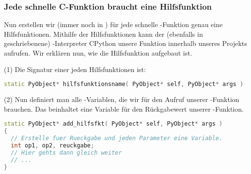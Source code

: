 \subsubsection{Jede schnelle C-Funktion braucht eine Hilfsfunktion}
Nun erstellen wir (immer noch in \C) für jede schnelle \C-Funktion genau eine Hilfsfunktionen.
Mithilfe der Hilfsfunktionen kann der (ebenfalls in \C geschriebenene) \Python-Interpreter CPython unsere Funktion  innerhalb unseres \Python Projekts aufrufen.
Wir erklären nun, wie die Hilfsfunktion aufgebaut ist.

(1) Die Signatur einer jeden Hilfsfunktionen ist:
\begin{lstlisting}[language=C++, style=CPP]
static PyObject* hilfsfunktionsname( PyObject* self, PyObject* args )
\end{lstlisting}

(2) Nun definiert man alle \C-Variablen, die wir für den Aufruf unserer \C-Funktion brauchen.
Das beinhaltet eine Variable für den Rückgabewert unserer \C-Funktion.
\begin{lstlisting}[language=C++, style=CPP]
static PyObject* add_hilfsfkt( PyObject* self, PyObject* args )
{
  // Erstelle fuer Rueckgabe und jeden Parameter eine Variable.
  int op1, op2, reuckgabe;
  // Hier gehts dann gleich weiter
  // ...
}
\end{lstlisting}

